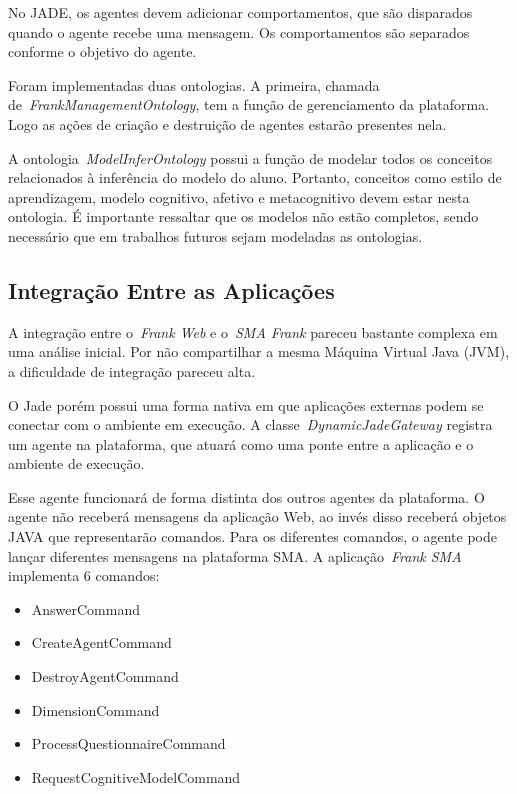 No JADE, os agentes devem adicionar comportamentos, que são disparados quando o agente recebe uma mensagem. Os comportamentos são separados conforme o objetivo do agente.

Foram implementadas duas ontologias. A primeira, chamada de~\emph{FrankManagementOntology}, tem a função de gerenciamento da plataforma. Logo as ações de criação e destruição de agentes estarão presentes nela.

A ontologia~\emph{ModelInferOntology} possui a função de modelar todos os conceitos relacionados à inferência do modelo do aluno. Portanto, conceitos como estilo de aprendizagem, modelo cognitivo, afetivo e metacognitivo devem estar nesta ontologia. É importante ressaltar que os modelos não estão completos, sendo necessário que em trabalhos futuros sejam modeladas as ontologias.

\subsection{Integração Entre as Aplicações}

A integração entre o~\emph{Frank Web} e o~\emph{SMA Frank} pareceu bastante complexa em uma análise inicial. Por não compartilhar a mesma Máquina Virtual Java (JVM), a dificuldade de integração pareceu alta.

O Jade porém possui uma forma nativa em que aplicações externas podem se conectar com o ambiente em execução. A classe~\emph{DynamicJadeGateway} registra um agente na plataforma, que atuará como uma ponte entre a aplicação e o ambiente de execução.

Esse agente funcionará de forma distinta dos outros agentes da plataforma. O agente não receberá mensagens da aplicação Web, ao invés disso receberá objetos JAVA que representarão comandos. Para os diferentes comandos, o agente pode lançar diferentes mensagens na plataforma SMA. A aplicação~\emph{Frank SMA} implementa 6 comandos:

\begin{itemize}
	\item AnswerCommand
	\item CreateAgentCommand
	\item DestroyAgentCommand
	\item DimensionCommand
	\item ProcessQuestionnaireCommand
	\item RequestCognitiveModelCommand
\end{itemize}


























